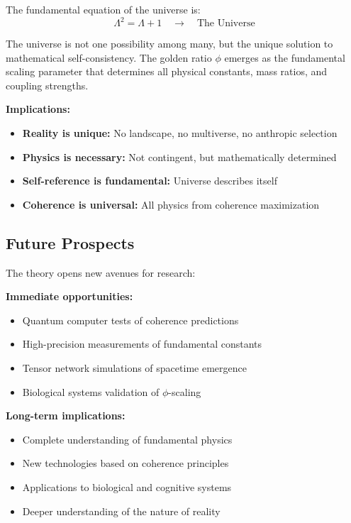 \documentclass[11pt]{article}
\theoremstyle{definition}
\newcommand{\goldenratio}{\phi}
\begin{document}
The fundamental equation of the universe is:
\begin{equation}
\Lambda^2 = \Lambda + 1 \quad \to \quad \text{The Universe}
\end{equation}

The universe is not one possibility among many, but the unique solution to mathematical self-consistency. The golden ratio $\goldenratio$ emerges as the fundamental scaling parameter that determines all physical constants, mass ratios, and coupling strengths.

\textbf{Implications:}
\begin{itemize}
\item \textbf{Reality is unique:} No landscape, no multiverse, no anthropic selection
\item \textbf{Physics is necessary:} Not contingent, but mathematically determined
\item \textbf{Self-reference is fundamental:} Universe describes itself
\item \textbf{Coherence is universal:} All physics from coherence maximization
\end{itemize}

\subsection{Future Prospects}

The theory opens new avenues for research:

\textbf{Immediate opportunities:}
\begin{itemize}
\item Quantum computer tests of coherence predictions
\item High-precision measurements of fundamental constants
\item Tensor network simulations of spacetime emergence
\item Biological systems validation of $\goldenratio$-scaling
\end{itemize}

\textbf{Long-term implications:}
\begin{itemize}
\item Complete understanding of fundamental physics
\item New technologies based on coherence principles
\item Applications to biological and cognitive systems
\item Deeper understanding of the nature of reality
\end{itemize}
\end{document}
